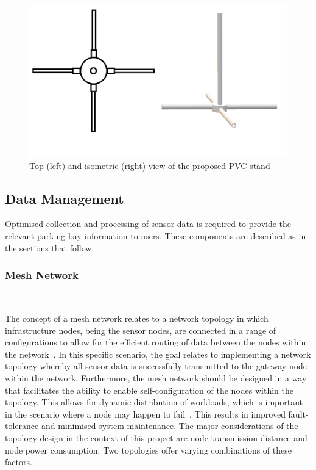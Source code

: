 \documentclass[10pt,twocolumn]{witseiepaper}
\begin{document}
		\begin{figure}
			\centering
			\includegraphics[width=1\columnwidth]{media/topIsoStand.png}
			\caption{Top (left) and isometric (right) view of the proposed PVC stand}
			\raggedright
			\label{fig:stand}
		\end{figure}
	
	\subsection{Data Management}
	
		Optimised collection and processing of sensor data is required to provide the relevant parking bay information to users. These components are described as in the sections that follow.
		
		\subsubsection{Mesh Network} $   $
		
			The concept of a mesh network relates to a network topology in which infrastructure nodes, being the sensor nodes, are connected in a range of configurations to allow for the efficient routing of data between the nodes within the network~\cite{mesh}. In this specific scenario, the goal relates to implementing a network topology whereby all sensor data is successfully transmitted to the gateway node within the network. Furthermore, the mesh network should be designed in a way that facilitates the ability to enable self-configuration of the nodes within the topology. This allows for dynamic distribution of workloads, which is important in the scenario where a node may happen to fail~\cite{mesh}. This results in improved fault-tolerance and minimised system maintenance. The major considerations of the topology design in the context of this project are node transmission distance and node power consumption. Two topologies offer varying combinations of these factors.
			
\end{document}
